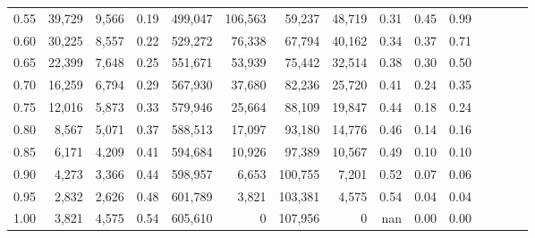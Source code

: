 \begin{tabular}{rrrcrrrrrrrrrrr}
0.55 &  39,729 &  9,566 &                                       0.19 &  499,047 &  106,563 &   59,237 &   48,719 &  0.31 &  0.45 &                         0.99 \\
0.60 &  30,225 &  8,557 &                                       0.22 &  529,272 &   76,338 &   67,794 &   40,162 &  0.34 &  0.37 &                         0.71 \\
0.65 &  22,399 &  7,648 &                                       0.25 &  551,671 &   53,939 &   75,442 &   32,514 &  0.38 &  0.30 &                         0.50 \\
0.70 &  16,259 &  6,794 &                                       0.29 &  567,930 &   37,680 &   82,236 &   25,720 &  0.41 &  0.24 &                         0.35 \\
0.75 &  12,016 &  5,873 &                                       0.33 &  579,946 &   25,664 &   88,109 &   19,847 &  0.44 &  0.18 &                         0.24 \\
0.80 &   8,567 &  5,071 &                                       0.37 &  588,513 &   17,097 &   93,180 &   14,776 &  0.46 &  0.14 &                         0.16 \\
0.85 &   6,171 &  4,209 &                                       0.41 &  594,684 &   10,926 &   97,389 &   10,567 &  0.49 &  0.10 &                         0.10 \\
0.90 &   4,273 &  3,366 &                                       0.44 &  598,957 &    6,653 &  100,755 &    7,201 &  0.52 &  0.07 &                         0.06 \\
0.95 &   2,832 &  2,626 &                                       0.48 &  601,789 &    3,821 &  103,381 &    4,575 &  0.54 &  0.04 &                         0.04 \\
1.00 &   3,821 &  4,575 &                                       0.54 &  605,610 &        0 &  107,956 &        0 &   nan &  0.00 &                         0.00 \\
\bottomrule
\end{tabular}
